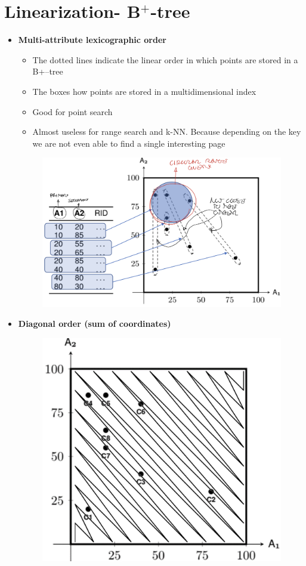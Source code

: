\section{Linearization- B$^+$-tree}
\begin{itemize}
    \item \textbf{Multi-attribute lexicographic order}
    \begin{itemize}
        \item The dotted lines indicate the linear order in which points are stored in a B+–tree
        \item The boxes how points are stored in a multidimensional index
        \item Good for point search
        \item Almost useless for range search and k-NN. Because depending on the key we are not even able to find a single interesting page
    \end{itemize}
    \begin{figure}[h]
         \centering
         \includegraphics[width=.5\linewidth]{images/DBMS_Internals/MultiDimensionalDataOrganizations/multi-att-lexigo.jpeg}
    \end{figure}
    
    \newpage
    \item \textbf{Diagonal order (sum of coordinates)}
    \begin{figure}[h]
         \centering
         \includegraphics[width=.4\linewidth]{images/DBMS_Internals/MultiDimensionalDataOrganizations/diagonal_order.jpeg}
    \end{figure}


\end{itemize}
